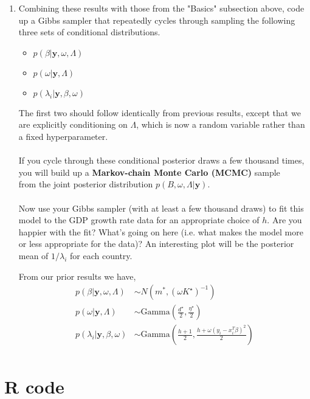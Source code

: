\documentclass{homework}
\begin{document}
\begin{enumerate}[label=(\Alph*)]
\item Combining these results with those from the "Basics" subsection above, code up a Gibbs sampler that repeatedly cycles through sampling the following three sets of conditional distributions.
\begin{itemize}
\item $p(\beta | \textbf{y},\omega,\Lambda) $ 
\item $p(\omega | \textbf{y}, \Lambda)$
\item $p(\lambda_i | \textbf{y}, \beta,\omega)$
\end{itemize}
The first two should follow identically from previous results, except that we are explicitly conditioning on $\Lambda$, which is now a random variable rather than a fixed hyperparameter. \\ \\
If you cycle through these conditional posterior draws a few thousand times, you will build up a \textbf{Markov-chain Monte Carlo (MCMC)} sample \\from the joint posterior distribution $p(B, \omega, \Lambda | \textbf{y})$. \\ \\
Now use your Gibbs sampler (with at least a few thousand draws) to fit this model to the GDP growth rate data for an appropriate choice of $h$. Are you happier with the fit? What's going on here (i.e. what makes the model more or less appropriate for the data)?  An interesting plot will be the posterior mean of $1/\lambda_i$ for each country.

From our prior results we have,
\begin{equation} \begin{split}
p(\beta | \textbf{y},\omega,\Lambda) &\sim N(m^*, (\omega K^\star)^{-1}) \\
p(\omega | \textbf{y}, \Lambda) & \sim \text{Gamma}\left( \frac{d^\star}{2}, \frac{\eta^\star}{2} \right) \\
p(\lambda_i | \textbf{y}, \beta,\omega) & \sim \text{Gamma}\left( \frac{h+1}{2}, \frac{h + \omega (y_i - x_i^T \beta)^2}{2} \right) \\
\end{split}\end{equation}

\end{enumerate}
\clearpage

\appendix
\chapter{R code}
\label{chap:code}
\end{document}
